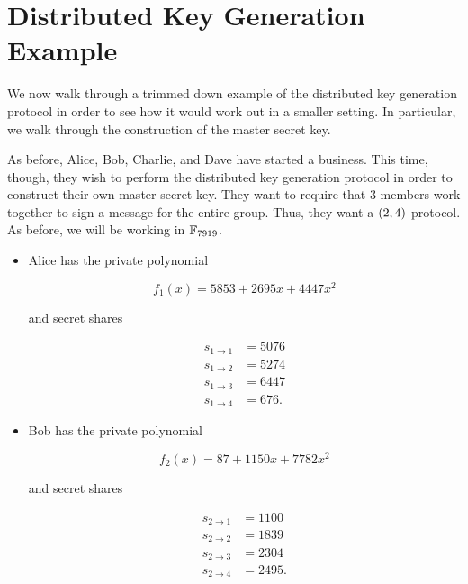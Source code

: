\section{Distributed Key Generation Example}
\label{sec:ss_dkg_examples}

We now walk through a trimmed down example of the
\gls{distributed key generation} protocol
in order to see how it would work out in a smaller setting.
In particular, we walk through the construction of the master secret key.

\begin{example}

As before, Alice, Bob, Charlie, and Dave have started a business.
This time, though, they wish to perform the \gls{distributed key generation}
protocol in order to construct their own master secret key.
They want to require that 3 members work together to sign a message
for the entire group.
Thus, they want a $\left( 2,4 \right)$ protocol.
As before, we will be working in $\mathbb{F}_{7919}$.

\begin{itemize}
\item Alice has the private polynomial

\begin{equation}
    f_{1}(x) = 5853 + 2695x + 4447x^{2}
\end{equation}

and secret shares

\begin{align}
    s_{1\to 1} &= 5076 \nonumber\\
    s_{1\to 2} &= 5274 \nonumber\\
    s_{1\to 3} &= 6447 \nonumber\\
    s_{1\to 4} &=  676.
\end{align}

\item Bob has the private polynomial

\begin{equation}
    f_{2}(x) = 87 + 1150x + 7782x^{2}
\end{equation}

and secret shares

\begin{align}
    s_{2\to 1} &= 1100 \nonumber\\
    s_{2\to 2} &= 1839 \nonumber\\
    s_{2\to 3} &= 2304 \nonumber\\
    s_{2\to 4} &= 2495.
\end{align}


\end{itemize}
\end{example}
